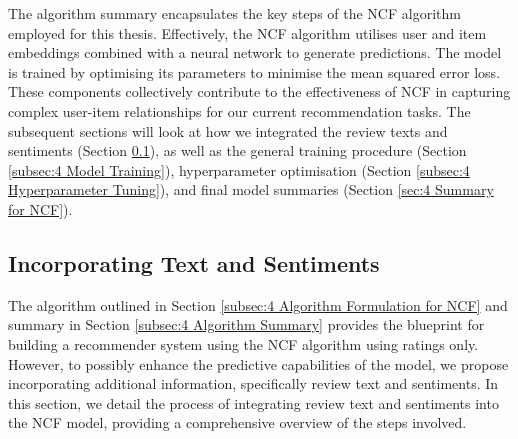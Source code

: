 The algorithm summary encapsulates the key steps of the NCF algorithm employed for this thesis. Effectively, the NCF algorithm utilises user and item embeddings combined with a neural network to generate predictions. The model is trained by optimising its parameters to minimise the mean squared error loss. These components collectively contribute to the effectiveness of NCF in capturing complex user-item relationships for our current recommendation tasks. The subsequent sections will look at how we integrated the review texts and sentiments (Section \ref{subsec:4 Incorporating Text and Sentiments}), as well as the general training procedure (Section \ref{subsec:4 Model Training}), hyperparameter optimisation (Section \ref{subsec:4 Hyperparameter Tuning}), and final model summaries (Section \ref{sec:4 Summary for NCF}).


\subsection{Incorporating Text and Sentiments}
\label{subsec:4 Incorporating Text and Sentiments}

The algorithm outlined in Section \ref{subsec:4 Algorithm Formulation for NCF} and summary in Section \ref{subsec:4 Algorithm Summary} provides the blueprint for building a recommender system using the NCF algorithm using ratings only. However, to possibly enhance the predictive capabilities of the model, we propose incorporating additional information, specifically review text and sentiments. In this section, we detail the process of integrating review text and sentiments into the NCF model, providing a comprehensive overview of the steps involved. 

